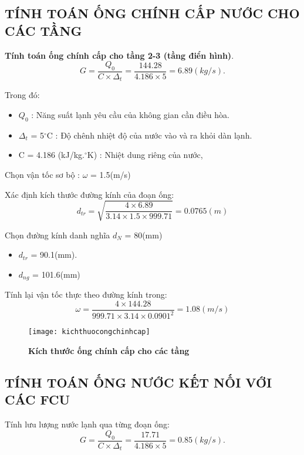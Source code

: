 \subsection{TÍNH TOÁN ỐNG CHÍNH CẤP NƯỚC CHO CÁC TẦNG}

\textbf{Tính toán ống chính cấp cho tầng 2-3 (tầng điển hình)}.
\begin{equation*}
	G = \dfrac{Q_{0}}{C \times \Delta_{t}} =\dfrac{144.28}{4.186 \times 5} = 6.89(kg/s).
\end{equation*}

\newpage
Trong đó:
\begin{itemize}
	\item $Q_{0}$ : Năng suất lạnh yêu cầu của không gian cần điều hòa.
	\item $\Delta_{t}$ = 5$^{\circ}$C : Độ chênh nhiệt độ của nước vào và ra khỏi dàn lạnh.
	\item C = 4.186 (kJ/kg.$^{\circ}$K) : Nhiệt dung riêng của nước,
\end{itemize}

Chọn vận tốc sơ bộ : $\omega$ = 1.5(m/s)

Xác định kích thước đường kính của đoạn ống:
\begin{equation*}
	d_{tr} = \sqrt{\dfrac{4 \times 6.89}{3.14 \times 1.5 \times 999.71}} = 0.0765(m)
\end{equation*}

Chọn đường kính danh nghĩa $d_{N}$ = 80(mm)
\begin{itemize}
	\item $d_{tr}$ = 90.1(mm).
	\item $d_{ng}$ = 101.6(mm)
\end{itemize}

Tính lại vận tốc thực theo đường kính trong:
\begin{equation*}
	\omega = \dfrac{4 \times 144.28 }{999.71 \times 3.14 \times 0.0901^{2}} = 1.08(m/s)
\end{equation*}

\begin{figure}[H]
 	\centering
 	\texttt{[image: kichthuocongchinhcap]}
 	\caption{\textbf{Kích thước ống chính cấp cho các tầng}}
	\label{kichthuocongchinhcap}	 
\end{figure}

\subsection{TÍNH TOÁN ỐNG NƯỚC KẾT NỐI VỚI CÁC FCU }
Tính lưu lượng nước lạnh qua từng đoạn ống:
\begin{equation*}
	G = \dfrac{Q_{0}}{C \times \Delta_{t}} =\dfrac{17.71}{4.186 \times 5} = 0.85(kg/s).
\end{equation*}

